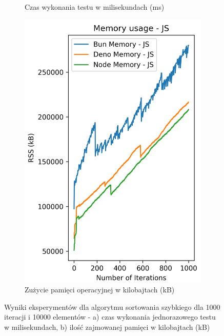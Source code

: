 \begin{figure}[H]
\begin{subfigure}[b]{0.44\textwidth}
    \caption{Czas wykonania testu w milisekundach (ms)}
    \label{fig:quick_sorting_e4_time}
  \end{subfigure}
  \begin{subfigure}[b]{0.44\textwidth}
    \centering
    \includegraphics[width=\textwidth]{Figures/sorting/sorting_quick_1000_10000_js_memory.png}
    \caption{Zużycie pamięci operacyjnej w kilobajtach (kB)}
    \label{fig:quick_sorting_e4_memory}
  \end{subfigure}
  \caption{Wyniki eksperymentów dla algorytmu sortowania szybkiego dla 1000 iteracji i 10000 elementów - a) czas wykonania jednorazowego testu w milisekundach, b) ilość zajmowanej pamięci w kilobajtach (kB)}
  \label{fig:quick_sorting_e4}
\end{figure}


